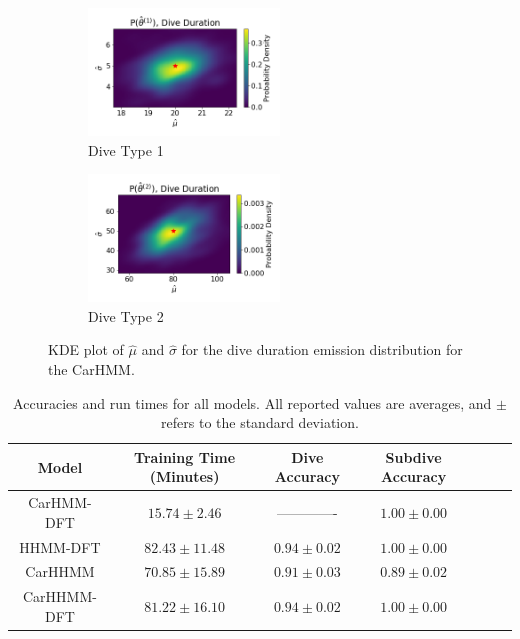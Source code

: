 \begin{figure}[ht]
    \centering
    \begin{subfigure}[t]{0.4\textwidth}
        \centering
        \includegraphics[width=2in]{../Plots/hhmm_FV_MLE_density_dive_duration_-1_0.png}
        \caption{Dive Type 1}
    \end{subfigure}
    \begin{subfigure}[t]{0.4\textwidth}
        \centering
        \includegraphics[width=2in]{../Plots/hhmm_FV_MLE_density_dive_duration_-1_1.png}
        \caption{Dive Type 2}
    \end{subfigure}
	\caption{KDE plot of $\hat \mu$ and $\hat \sigma$ for the dive duration emission distribution for the CarHMM.}
	\label{fig:MLE_dist}
\end{figure}

\begin{table}
\centering
\caption{Accuracies and run times for all models. All reported values are averages, and $\pm$ refers to the standard deviation.}
\begin{tabular}{ccccccc}
Model       & \multicolumn{1}{c}{Training Time (Minutes)} & \multicolumn{1}{c}{Dive Accuracy} & \multicolumn{1}{c}{Subdive Accuracy}  \\ \hline
CarHMM-DFT  & $15.74 \pm 2.46$                            & -------------                     & $1.00 \pm 0.00$                       \\ 
HHMM-DFT    & $82.43 \pm 11.48$                           & $0.94 \pm 0.02$                   & $1.00 \pm 0.00$                       \\
CarHHMM     & $70.85 \pm 15.89$                           & $0.91 \pm 0.03$                   & $0.89 \pm 0.02$                       \\
CarHHMM-DFT & $81.22 \pm 16.10$                           & $0.94 \pm 0.02$                   & $1.00 \pm 0.00$                       \\
\end{tabular}
\label{table:accuracy}
\end{table}

